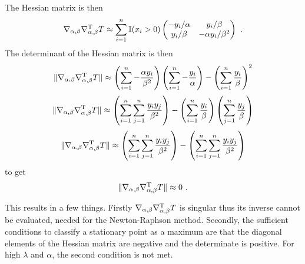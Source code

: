 \documentclass[12pt, a4paper]{memoir}
\newcommand{\T}{^\textup{T}}
\begin{document}
The Hessian matrix is then
\begin{equation}
	\nabla_{\alpha,\beta}\nabla_{\alpha,\beta}\T T \approx
	\sum_{i=1}^n
	\mathbb{I}(x_i>0)
	\begin{pmatrix}
		-y_i/\alpha  & y_i/\beta \\
		y_i/\beta & -\alpha y_i/\beta^2
	\end{pmatrix}
	\ . 
\end{equation}
The determinant of the Hessian matrix is then
\begin{equation*}
	\|\nabla_{\alpha,\beta}\nabla_{\alpha,\beta}\T T\|
	\approx
	\left(\sum_{i=1}^n-\frac{\alpha y_i}{\beta^2}\right)
	\left(\sum_{i=1}^n-\frac{y_i}{\alpha}\right) - \left(\sum_{i=1}^n\frac{y_i}{\beta}\right)^2
\end{equation*}
\begin{equation*}
	\|\nabla_{\alpha,\beta}\nabla_{\alpha,\beta}\T T\|
	\approx
	\left(\sum_{i=1}^n\sum_{j=1}^n\frac{y_iy_j}{\beta^2}\right)
	 - \left(\sum_{i=1}^n\frac{y_i}{\beta}\right)\left(\sum_{j=1}^n\frac{y_j}{\beta}\right)
\end{equation*}
\begin{equation*}
	\|\nabla_{\alpha,\beta}\nabla_{\alpha,\beta}\T T\|
	\approx
	\left(\sum_{i=1}^n\sum_{j=1}^n\frac{y_iy_j}{\beta^2}\right)
	 - \left(\sum_{i=1}^n\sum_{j=1}^n\frac{y_iy_j}{\beta^2}\right)
\end{equation*}
to get
\begin{equation}
	\|\nabla_{\alpha,\beta}\nabla_{\alpha,\beta}\T T\|
	\approx
	0
	\ .
\end{equation}

This results in a few things. Firstly $\nabla_{\alpha,\beta}\nabla_{\alpha,\beta}\T T$ is singular thus its inverse cannot be evaluated, needed for the Newton-Raphson method. Secondly, the sufficient conditions to classify a stationary point as a maximum are that the diagonal elements of the Hessian matrix are negative and the determinate is positive. For high $\lambda$ and $\alpha$, the second condition is not met.
\end{document}
